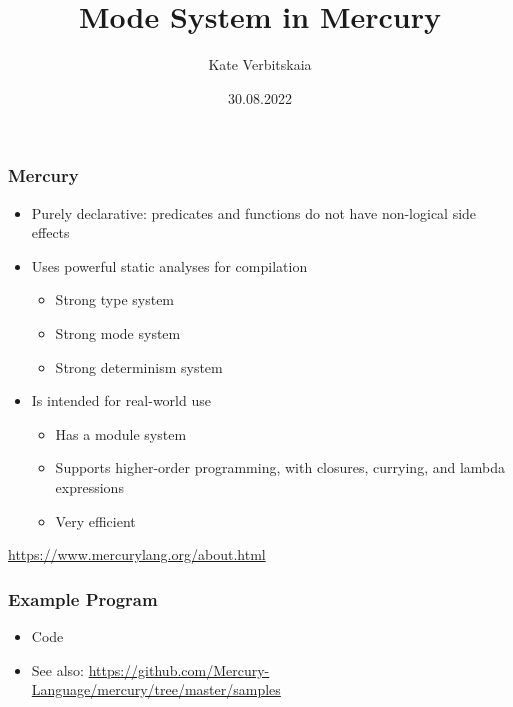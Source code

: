 \documentclass{beamer}
\title[]{Mode System in Mercury}
\subtitle[]{}
\institute[]{JetBrains Programming Languages and Tools Lab
}
\author[]{Kate Verbitskaia}
\date{30.08.2022}
\begin{document}
{
  \begin{frame}
    \titlepage
  \end{frame}
}

\begin{frame}[fragile]
  \frametitle{Mercury}
\begin{itemize}
  \item Purely declarative: predicates and functions do not have non-logical side effects
  \item Uses powerful static analyses for compilation
  \begin{itemize}
    \item Strong type system
    \item Strong mode system
    \item Strong determinism system
  \end{itemize}
  \item Is intended for real-world use
  \begin{itemize}
    \item Has a module system
    \item Supports higher-order programming, with closures, currying, and lambda expressions
    \item Very efficient
  \end{itemize}
\end{itemize}

\vfill

\url{https://www.mercurylang.org/about.html}

\end{frame}

\begin{frame}[fragile]
  \frametitle{Example Program}
\begin{itemize}
  \item Code
  \item See also: \url{https://github.com/Mercury-Language/mercury/tree/master/samples}
\end{itemize}
\end{frame}
\end{document}
